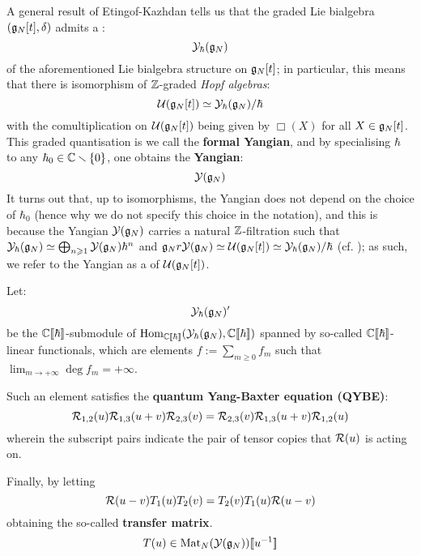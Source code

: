         A general result of Etingof-Kazhdan tells us that the graded Lie bialgebra $(\mathfrak{g}_N[t], \delta)$ admits a :
            $$\mathcal{Y}_{\hbar}(\mathfrak{g}_N)$$
        of the aforementioned Lie bialgebra structure on $\mathfrak{g}_N[t]$; in particular, this means that there is isomorphism of $\mathbb{Z}$-graded \textit{Hopf algebras}:
            $$\mathcal{U}(\mathfrak{g}_N[t]) \simeq \mathcal{Y}_{\hbar}(\mathfrak{g}_N)/\hbar$$
        with the comultiplication on $\mathcal{U}(\mathfrak{g}_N[t])$ being given by $\Box(X)$ for all $X \in \mathfrak{g}_N[t]$. This graded quantisation is we call the \textbf{formal Yangian}, and by specialising $\hbar$ to any $\hbar_0 \in \mathbb{C} \smallsetminus \{0\}$, one obtains the \textbf{Yangian}:
            $$\mathcal{Y}(\mathfrak{g}_N)$$
        It turns out that, up to isomorphisms, the Yangian does not depend on the choice of $\hbar_0$ (hence why we do not specify this choice in the notation), and this is because the Yangian $\mathcal{Y}(\mathfrak{g}_N)$ carries a natural $\mathbb{Z}$-filtration such that $\mathcal{Y}_{\hbar}(\mathfrak{g}_N) \simeq \bigoplus_{n \geqslant 1} \mathcal{Y}(\mathfrak{g}_N) \hbar^n$ and $\mathfrak{g}_Nr \mathcal{Y}(\mathfrak{g}_N) \simeq \mathcal{U}(\mathfrak{g}_N[t]) \simeq \mathcal{Y}_{\hbar}(\mathfrak{g}_N)/\hbar$ (cf. \cite{drinfeld_original_yangian_paper}); as such, we refer to the Yangian as a  of $\mathcal{U}(\mathfrak{g}_N[t])$.

        Let:
            $$\mathcal{Y}_{\hbar}(\mathfrak{g}_N)'$$
        be the $\mathbb{C}[\![\hbar]\!]$-submodule of $\operatorname{Hom}_{\mathbb{C}[\![\hbar]\!]}( \mathcal{Y}_{\hbar}(\mathfrak{g}_N), \mathbb{C}[\![\hbar]\!] )$ spanned by so-called  $\mathbb{C}[\![\hbar]\!]$-linear functionals, which are elements $f := \sum_{m \geq 0} f_m$ such that $\lim_{m \to +\infty} \deg f_m = +\infty$.
            
        Such an element satisfies the \textbf{quantum Yang-Baxter equation (QYBE)}:
            \begin{equation} \label{equation: additive_spectral_QYBE}
                \mathcal{R}_{1, 2}(u) \mathcal{R}_{1, 3}(u + v) \mathcal{R}_{2, 3}(v) = \mathcal{R}_{2, 3}(v) \mathcal{R}_{1, 3}(u + v) \mathcal{R}_{1, 2}(u)
            \end{equation}
        wherein the subscript pairs indicate the pair of tensor copies that $\mathcal{R}(u)$ is acting on.

        Finally, by letting 
            \begin{equation} \label{equation: RTT_relation}
                \mathcal{R}(u - v) T_1(u) T_2(v) = T_2(v) T_1(u) \mathcal{R}(u - v)
            \end{equation}
        obtaining the so-called \textbf{transfer matrix}.
            $$T(u) \in \operatorname{Mat}_N( \mathcal{Y}(\mathfrak{g}_N) )[\![u^{-1}]\!]$$
    
